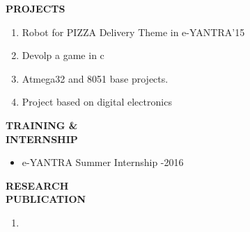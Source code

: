 \documentclass{article}
\begin{document}
\begin{flushleft} 
	\vspace{0.2in}
	\textbf{PROJECTS}
	\begin{enumerate}
		\vspace{-0.29in}
		\addtolength{\itemindent}{1.359in}
		\item  Robot for PIZZA Delivery Theme in e-YANTRA'15
		\item  Devolp a game in c
		\item  Atmega32 and 8051 base projects.
		\item  Project based on digital electronics
	\end{enumerate}
\end{flushleft}

 \begin{flushleft} 
 	\vspace{0.4in}
 	\textbf{TRAINING \& \\ INTERNSHIP}
 	\begin{itemize}
 		\vspace{-0.44in}
 		\addtolength{\itemindent}{1.359in}
 		\item  e-YANTRA Summer Internship -2016
 	\end{itemize}
 \end{flushleft}

 \begin{flushleft} 
 	\vspace{0.4in}
 	\textbf{RESEARCH \\ PUBLICATION}
 	\begin{enumerate}
 		\vspace{-0.45in}
 		\addtolength{\itemindent}{1.359in}
 		\item  
 	\end{enumerate}
 \end{flushleft}
\end{document}
